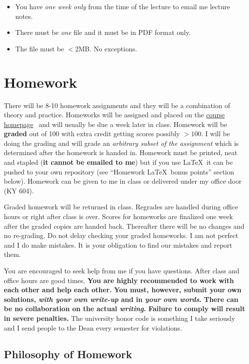 \documentclass[12pt]{article}
\newcommand{\ingreen}[1]{\color{green}\textbf{#1} \color{black}}
\newcommand{\inred}[1]{\color{red}\textbf{#1} \color{black}}
\newcommand{\coursewebpage}{\href{https://github.com/kapelner/QC_Math_390.4_Spring_2019}{course homepage}}
\newcommand{\qu}[1]{``#1''}
\begin{document}
\begin{itemize}
\item You have \emph{one week only} from the time of the lecture to email me lecture notes.
\item There must be \emph{one} file and it must be in PDF format only.
\item The file must be $<$2MB. No exceptions.
\end{itemize}

\section*{Homework}

There will be 8-10 homework assignments and they will be a combination of theory and practice. Homeworks will be assigned and placed on the \coursewebpage~ and will usually be due a week later in class. Homework will be \textbf{graded} out of 100 with extra credit getting scores possibly $> 100$. I will be doing the grading and will grade an \textit{arbitrary subset of the assignment} which is determined after the homework is handed in. Homework must be printed, neat and stapled (\textbf{it cannot be emailed to me}) but if you use \LaTeX~it can be pushed to your own repository (see \qu{Homework \LaTeX~bonus points} section below). Homework can be given to me in class or delivered under my office door (KY 604).

Graded homework will be returned in class. Regrades are handled during office hours or right after class is over. Scores for homeworks are finalized one week after the graded copies are handed back. Thereafter there will be no changes and no re-grading. Do not delay checking your graded homeworks. I am not perfect and I do make mistakes. It is your obligation to find our mistakes and report them.

You are encouraged to seek help from me if you have questions. After class and office hours are good times. \ingreen{You are highly recommended to work with each other and help each other.} \inred{You must, however, submit your own solutions, \textit{with your own write-up} and in \textit{your own words}. There can be no collaboration on the actual \textit{writing}. Failure to comply will result in severe penalties.} The university honor code is something I take seriously and I send people to the Dean every semester for violations.

\subsection*{Philosophy of Homework}
\end{document}
